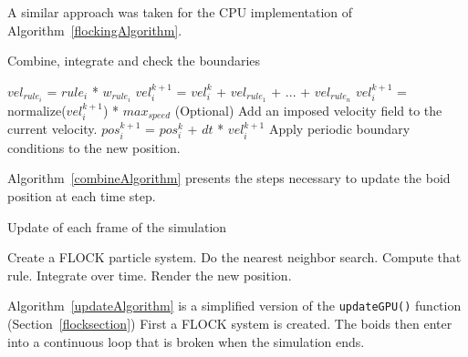 A similar approach was taken for the CPU implementation of 
Algorithm~\ref{flockingAlgorithm}.

\begin{algorithm}
\caption{Combine, integrate and check the boundaries}
\label{combineAlgorithm}
\begin{algorithmic}
\STATE $vel_{rule_i}$  = $rule_i$ * $w_{rule_i}$ 
\STATE $vel_i^{k+1}$ = $vel_i^k$ + $vel_{rule_1}$ + ... + $vel_{rule_n}$
	\STATE $vel_i^{k+1}$ = normalize($vel_i^{k+1}$) * $max_{speed}$
\ENDIF  
\STATE (Optional) Add an imposed velocity field to the current velocity.
\STATE $pos_i^{k+1}$ = $pos_i^{k}$ + $dt$ * $vel_i^{k+1}$
\STATE Apply periodic boundary conditions to the new position.
\end{algorithmic}
\end{algorithm}

Algorithm~\ref{combineAlgorithm} presents the steps  necessary  
to update the boid position at each time step.

\begin{algorithm}
\caption{Update of each frame of the simulation}
\label{updateAlgorithm}
\begin{algorithmic}
\STATE Create a FLOCK particle system.
\STATE Do the nearest neighbor search.
\STATE Compute that rule.
\STATE Integrate over time.
\STATE Render the new position.
\ENDFOR
\end{algorithmic}
\end{algorithm}

Algorithm~\ref{updateAlgorithm} is a simplified version of 
the \texttt{updateGPU()} function (Section~\ref{flocksection}) 
First a FLOCK system is created. The boids then enter into a continuous loop 
that is broken when the simulation ends. 

